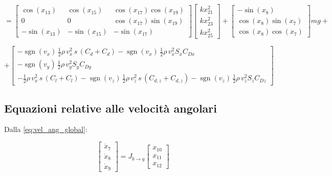 \begin{equation*}
=
\begin{bmatrix}
	\cos(x_{13}) & \cos(x_{15}) & \cos(x_{17})\cos(x_{19}) \\
	0            & 0            & \cos(x_{17})\sin(x_{19}) \\
	-\sin(x_{13}) & -\sin(x_{15}) & -\sin(x_{17})
\end{bmatrix}
\begin{bmatrix}
	kx_{21}^2 \\
	kx_{23}^2  \\
	kx_{25}^2 
\end{bmatrix}
+
\begin{bmatrix}
	-\sin(x_8) \\
	\cos(x_8)\sin(x_7) \\
	\cos(x_8)\cos(x_7)
\end{bmatrix} m g
+
\end{equation*}

\begin{equation}
+
\begin{bmatrix}
	  	-\operatorname{sgn}(v_x) \,\frac{1}{2}\rho\, v_x^2\, s\, (C_d + C_d) -\operatorname{sgn}(v_x) \,\frac{1}{2}\rho\, v_x^2 S_{x} C_{Dx} \\
	  	-\operatorname{sgn}(v_y)\,\frac{1}{2}\rho\, v_y^2 S_{y} C_{Dy} \\
	  	-\frac{1}{2}\rho\, v_x^2\, s\, (C_l + C_l) - \operatorname{sgn}(v_z)\,\frac{1}{2}\rho\, v_z^2\, s\, (C_{d,z} + C_{d,z}) - \operatorname{sgn}(v_z) \,\frac{1}{2}\rho\, v_z^2 S_{z} C_{Dz}
\end{bmatrix}
\end{equation}
     
\clearpage


\subsection{Equazioni relative alle velocità angolari}
     \vspace{0.5cm}
     Dalla \ref{eq:vel_ang_global}:
     
	 \begin{equation}
		\begin{bmatrix}
     	\dot{x}_7 \\[4pt]
     	\dot{x}_8 \\[4pt]
     	\dot{x}_9
     \end{bmatrix}
     =
     J_{b \to g}
     \begin{bmatrix}
     	x_{10} \\ x_{11} \\ x_{12}
     \end{bmatrix}
	 \end{equation}

